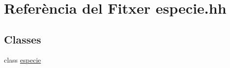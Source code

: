 \hypertarget{especie_8hh}{}\section{Referència del Fitxer especie.\+hh}
\label{especie_8hh}
\subsection*{Classes}
\begin{DoxyCompactItemize}
\item 
class \hyperlink{classespecie}{especie}
\end{DoxyCompactItemize}
